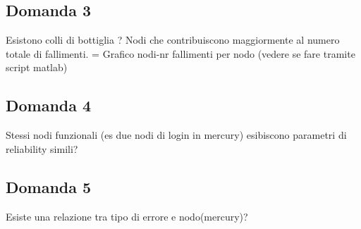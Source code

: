 \subsection{Domanda 3}
Esistono colli di bottiglia ? Nodi che contribuiscono maggiormente al numero totale di fallimenti. = Grafico nodi-nr fallimenti per nodo (vedere se fare tramite script matlab)
\subsection{Domanda 4}
Stessi nodi funzionali (es due nodi di login in mercury) esibiscono parametri di reliability simili?
\subsection{Domanda 5}
Esiste una relazione tra tipo di errore e nodo(mercury)?

